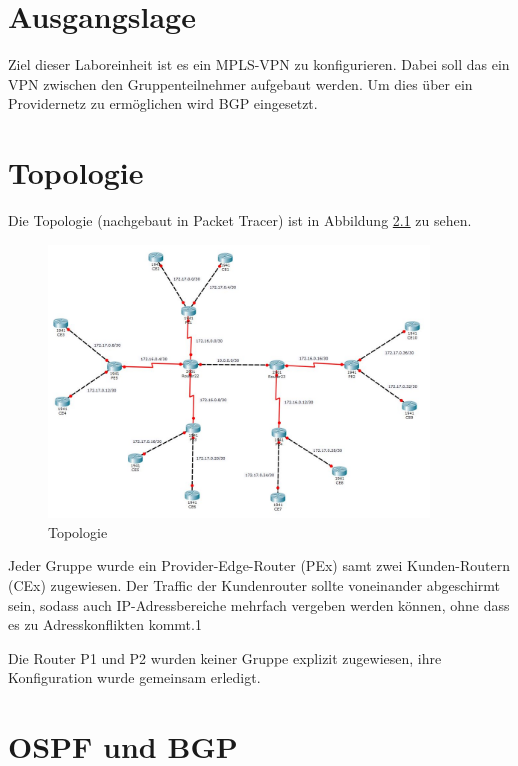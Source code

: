 \thispagestyle{standard}
\pagestyle{standard}
\chapter{Ausgangslage}

Ziel dieser Laboreinheit ist es ein \ac{MPLS}-VPN zu konfigurieren. Dabei soll das ein VPN zwischen den Gruppenteilnehmer aufgebaut werden. Um dies über ein Providernetz zu ermöglichen wird \ac{BGP} eingesetzt. 

\chapter{Topologie}

Die Topologie (nachgebaut in Packet Tracer) ist in Abbildung \ref{img:topo} zu sehen.

\begin{figure}[H]
	\centering
	\includegraphics[width=0.9\textwidth]{img/Topologie.JPG}
	\caption{Topologie}
	\label{img:topo}
\end{figure}

Jeder Gruppe wurde ein Provider-Edge-Router (PEx) samt zwei Kunden-Routern (CEx) zugewiesen. Der Traffic der Kundenrouter sollte voneinander abgeschirmt sein, sodass auch IP-Adressbereiche mehrfach vergeben werden können, ohne dass es zu Adresskonflikten kommt.1


Die Router P1 und P2 wurden keiner Gruppe explizit zugewiesen, ihre Konfiguration wurde gemeinsam erledigt.

\chapter{OSPF und BGP}

